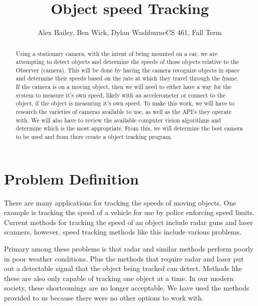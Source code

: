 \documentclass[letterpaper,10pt,onecolumn,draftclsnofoot]{IEEEtran}
\title{Object speed Tracking}
\author{Alex Bailey, Ben Wick, Dylan WashburneCS 461, Fall Term}
\begin{document}
\begin{titlepage}

\maketitle

\begin{abstract}
Using a stationary camera, with the intent of being mounted on a car, we are attempting to  detect objects and determine the speeds of those objects relative to the Observer (camera).
This will be done by having the camera recognize objects in space and determine their speeds based on the rate at which they travel through the frame.
If the camera is on a moving object, then we will need to either have a way for the system to measure it's own speed, likely with an accelerometer or connect to the object, if the object is measuring it's own speed.
To make this work, we will have to research the varieties of cameras available to use, as well as the API’s  they operate with.
We will also have to review the available computer vision algorithms and determine which is the most appropriate.
From this, we will determine the best camera to be used and from there create a object tracking program.
 
\end{abstract}

\end{titlepage}

\section{Problem Definition}

There are many applications for tracking the speeds of moving objects.
One example is tracking the speed of a vehicle for use by police enforcing speed limits.
 Current methods for tracking the speed of an object include radar guns and laser scanners, however, speed tracking methods like this include various problems.

 Primary among these problems is that radar and similar methods perform poorly in poor weather conditions.
 Plus the methods that require radar and laser put out a detectable signal that the object being tracked can detect.
  Methods like these are also only capable of tracking one object at a time.
 In our modern society, these shortcomings are no longer acceptable.
 We have used the methods provided to us because there were no other options to work with.


\end{document}
